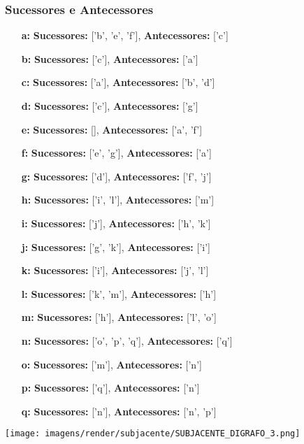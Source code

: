 \documentclass[a4paper,12pt]{article}
\begin{document}
\subsubsection*{Sucessores e Antecessores}
\begin{itemize}[leftmargin=*]
    \item[\textbf{a:}] \textbf{Sucessores:} ['b', 'e', 'f'], \textbf{Antecessores:} ['c']
    \item[\textbf{b:}] \textbf{Sucessores:} ['c'], \textbf{Antecessores:} ['a']
    \item[\textbf{c:}] \textbf{Sucessores:} ['a'], \textbf{Antecessores:} ['b', 'd']
    \item[\textbf{d:}] \textbf{Sucessores:} ['c'], \textbf{Antecessores:} ['g']
    \item[\textbf{e:}] \textbf{Sucessores:} [], \textbf{Antecessores:} ['a', 'f']
    \item[\textbf{f:}] \textbf{Sucessores:} ['e', 'g'], \textbf{Antecessores:} ['a']
    \item[\textbf{g:}] \textbf{Sucessores:} ['d'], \textbf{Antecessores:} ['f', 'j']
    \item[\textbf{h:}] \textbf{Sucessores:} ['i', 'l'], \textbf{Antecessores:} ['m']
    \item[\textbf{i:}] \textbf{Sucessores:} ['j'], \textbf{Antecessores:} ['h', 'k']
    \item[\textbf{j:}] \textbf{Sucessores:} ['g', 'k'], \textbf{Antecessores:} ['i']
    \item[\textbf{k:}] \textbf{Sucessores:} ['i'], \textbf{Antecessores:} ['j', 'l']
    \item[\textbf{l:}] \textbf{Sucessores:} ['k', 'm'], \textbf{Antecessores:} ['h']
    \item[\textbf{m:}] \textbf{Sucessores:} ['h'], \textbf{Antecessores:} ['l', 'o']
    \item[\textbf{n:}] \textbf{Sucessores:} ['o', 'p', 'q'], \textbf{Antecessores:} ['q']
    \item[\textbf{o:}] \textbf{Sucessores:} ['m'], \textbf{Antecessores:} ['n']
    \item[\textbf{p:}] \textbf{Sucessores:} ['q'], \textbf{Antecessores:} ['n']
    \item[\textbf{q:}] \textbf{Sucessores:} ['n'], \textbf{Antecessores:} ['n', 'p']
\end{itemize}

\begin{center}
    \texttt{[image: imagens/render/subjacente/SUBJACENTE\_DIGRAFO\_3.png]}
\end{center}
\end{document}

